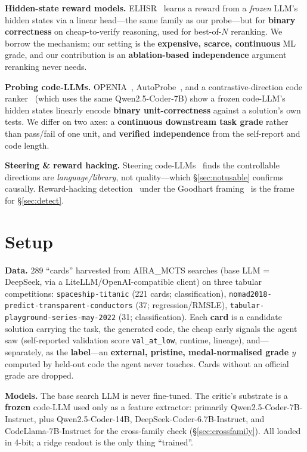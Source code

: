 \documentclass[10pt]{article}
\newcommand{\code}[1]{\texttt{#1}}
\begin{document}
\textbf{Hidden-state reward models.} ELHSR~\cite{elhsr} learns a reward from a \emph{frozen} LLM's hidden states via a linear head---the same family as our probe---but for \textbf{binary correctness} on cheap-to-verify reasoning, used for best-of-$N$ reranking. We borrow the mechanism; our setting is the \textbf{expensive, scarce, continuous} ML grade, and our contribution is an \textbf{ablation-based independence} argument reranking never needs.

\textbf{Probing code-LLMs.} OPENIA~\cite{openia}, AutoProbe~\cite{autoprobe}, and a contrastive-direction code ranker~\cite{ranker} (which uses the same Qwen2.5-Coder-7B) show a frozen code-LLM's hidden states linearly encode \textbf{binary unit-correctness} against a solution's own tests. We differ on two axes: a \textbf{continuous downstream task grade} rather than pass/fail of one unit, and \textbf{verified independence} from the self-report and code length.

\textbf{Steering \& reward hacking.} Steering code-LLMs~\cite{steer} finds the controllable directions are \emph{language/library}, not quality---which \S\ref{sec:notusable} confirms causally. Reward-hacking detection~\cite{rh1,rh2} under the Goodhart framing~\cite{goodhart} is the frame for \S\ref{sec:detect}.

\section{Setup}
\textbf{Data.} 289 ``cards'' harvested from AIRA\_MCTS searches (base LLM {=} DeepSeek, via a LiteLLM/OpenAI-compatible client) on three tabular competitions: \code{spaceship-titanic} (221 cards; classification), \code{nomad2018-predict-transparent-conductors} (37; regression/RMSLE), \code{tabular-playground-series-may-2022} (31; classification). Each \textbf{card} is a candidate solution carrying the task, the generated code, the cheap early signals the agent saw (self-reported validation score \code{val\_at\_low}, runtime, lineage), and---separately, as the \textbf{label}---an \textbf{external, pristine, medal-normalised grade $y$} computed by held-out code the agent never touches. Cards without an official grade are dropped.

\textbf{Models.} The base search LLM is never fine-tuned. The critic's substrate is a \textbf{frozen} code-LLM used only as a feature extractor: primarily Qwen2.5-Coder-7B-Instruct, plus Qwen2.5-Coder-14B, DeepSeek-Coder-6.7B-Instruct, and CodeLlama-7B-Instruct for the cross-family check (\S\ref{sec:crossfamily}). All loaded in 4-bit; a ridge readout is the only thing ``trained''.
\end{document}
